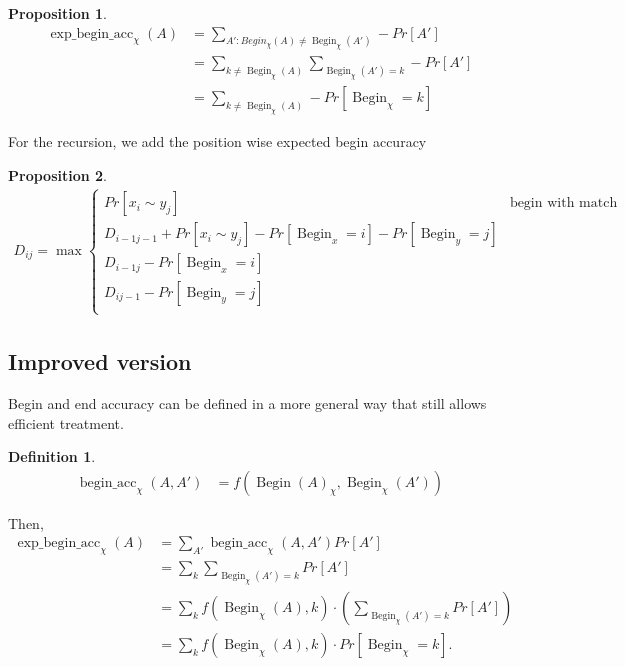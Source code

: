 \documentclass{article}
\newtheorem{definition}{Definition}
\newtheorem{proposition}{Proposition}
\newcommand{\Begin}{\operatorname{Begin}}
\newcommand{\accbegin}{\operatorname{begin\_acc}}
\newcommand{\expbeginacc}{\operatorname{exp\_begin\_acc}}
\begin{document}
\begin{proposition}
  \begin{align*}
    \expbeginacc_\chi(A)
    & = \sum_{A': Begin_\chi(A)\neq \Begin_\chi(A')} -Pr[A']\\
    & = \sum_{k\neq\Begin_\chi(A)} \sum_{\Begin_\chi(A')=k} -Pr[A']\\
    & = \sum_{k\neq\Begin_\chi(A)} - Pr[\Begin_\chi=k]
  \end{align*}
\end{proposition}

For the recursion, we add the position wise expected begin accuracy
\begin{proposition}
  \begin{align*}
    D_{ij} = \max 
    \begin{cases}
      Pr[x_i\sim y_j] & \text{begin with match of i and j}\\
      D_{i-1 j-1} + Pr[x_i\sim y_j] - Pr[\Begin_x=i] - Pr[\Begin_y=j] &\\
      D_{i-1 j} - Pr[\Begin_x=i] &\\
      D_{i j-1} - Pr[\Begin_y=j] &\\
    \end{cases}
  \end{align*}
\end{proposition}



\subsection{Improved version}

Begin and end accuracy can be defined in a more general way that still allows
efficient treatment.
\begin{definition}
  \begin{align*}
    \accbegin_\chi(A,A') &= f(\Begin(A)_\chi,\Begin_\chi(A'))
  \end{align*}
\end{definition}

Then,
\begin{align*}
    \expbeginacc_\chi(A) & = \sum_{A'} \accbegin_\chi(A,A') Pr[A']\\
    & = \sum_{k} \sum_{\Begin_\chi(A')=k} Pr[A'] \\
    & = \sum_{k} f(\Begin_\chi(A),k) \cdot ( \sum_{\Begin_\chi(A')=k}
    Pr[A'] )\\
    & = \sum_{k} f(\Begin_\chi(A),k) \cdot Pr[\Begin_\chi=k].
\end{align*}
\end{document}
